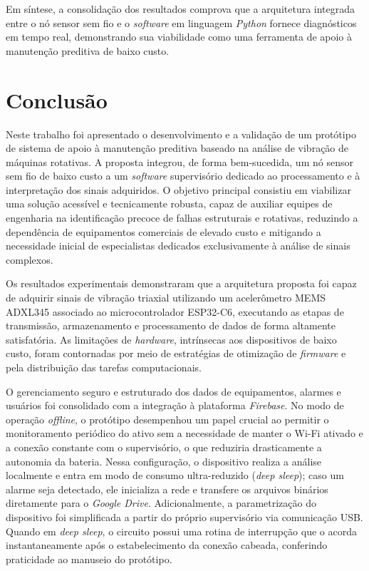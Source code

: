 \documentclass[conference]{IEEEtran}
\begin{document}
Em síntese, a consolidação dos resultados comprova que a arquitetura integrada entre o nó sensor sem fio e o \textit{software} em linguagem \textit{Python} fornece diagnósticos em tempo real, demonstrando sua viabilidade como uma ferramenta de apoio à manutenção preditiva de baixo custo.


\section{Conclusão}
Neste trabalho foi apresentado o desenvolvimento e a validação de um protótipo de sistema de apoio à manutenção preditiva baseado na análise de vibração de máquinas rotativas. A proposta integrou, de forma bem-sucedida, um nó sensor sem fio de baixo custo a um \textit{software} supervisório dedicado ao processamento e à interpretação dos sinais adquiridos. O objetivo principal consistiu em viabilizar uma solução acessível e tecnicamente robusta, capaz de auxiliar equipes de engenharia na identificação precoce de falhas estruturais e rotativas, reduzindo a dependência de equipamentos comerciais de elevado custo e mitigando a necessidade inicial de especialistas dedicados exclusivamente à análise de sinais complexos.

Os resultados experimentais demonstraram que a arquitetura proposta foi capaz de adquirir sinais de vibração triaxial utilizando um acelerômetro MEMS ADXL345 associado ao microcontrolador ESP32-C6, executando as etapas de transmissão, armazenamento e processamento de dados de forma altamente satisfatória. As limitações de \textit{hardware}, intrínsecas aos dispositivos de baixo custo, foram contornadas por meio de estratégias de otimização de \textit{firmware} e pela distribuição das tarefas computacionais.

O gerenciamento seguro e estruturado dos dados de equipamentos, alarmes e usuários foi consolidado com a integração à plataforma \textit{Firebase}. No modo de operação \textit{offline}, o protótipo desempenhou um papel crucial ao permitir o monitoramento periódico do ativo sem a necessidade de manter o Wi-Fi ativado e a conexão constante com o supervisório, o que reduziria drasticamente a autonomia da bateria. Nessa configuração, o dispositivo realiza a análise localmente e entra em modo de consumo ultra-reduzido (\textit{deep sleep}); caso um alarme seja detectado, ele inicializa a rede e transfere os arquivos binários diretamente para o \textit{Google Drive}. Adicionalmente, a parametrização do dispositivo foi simplificada a partir do próprio supervisório via comunicação USB. Quando em \textit{deep sleep}, o circuito possui uma rotina de interrupção que o acorda instantaneamente após o estabelecimento da conexão cabeada, conferindo praticidade ao manuseio do protótipo.
\end{document}
